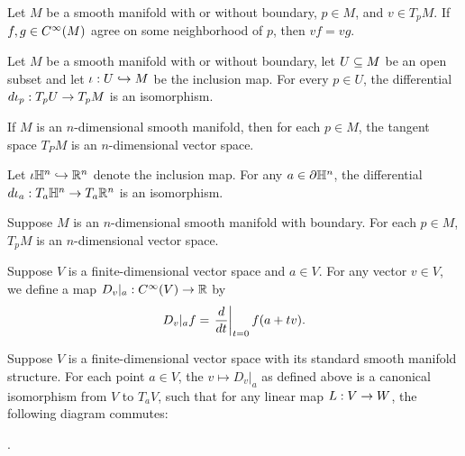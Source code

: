 \setcounter{thm}{7}

\begin{prop}
Let $M$ be a smooth manifold with or without boundary, $p\in M$, and $v\in T_pM$. If $f,g\in C^\infty(M)$ agree on some neighborhood of $p$, then $vf = vg$.
\end{prop}

\begin{prop}
Let $M$ be a smooth manifold with or without boundary, let $U\subseteq M$ be an open subset and let $\iota:U\hookrightarrow M$ be the inclusion map. For every $p\in U$, the differential $d\iota_p:T_pU\rightarrow T_pM$ is an isomorphism.
\end{prop}

\begin{prop}
If $M$ is an $n$-dimensional smooth manifold, then for each $p\in M$, the tangent space $T_PM$ is an $n$-dimensional vector space.
\end{prop}

\begin{lem}
Let $\iota\mathbb{H}^n\hookrightarrow \mathbb{R}^n$ denote the inclusion map. For any $a\in \partial \mathbb{H}^n$, the differential $d\iota_a:T_a\mathbb{H}^n\rightarrow T_a\mathbb{R}^n$ is an isomorphism.
\end{lem}

\begin{prop}
Suppose $M$ is an $n$-dimensional smooth manifold with boundary. For each $p\in M$, $T_pM$ is an $n$-dimensional vector space.
\end{prop}

\dfn Suppose $V$ is a finite-dimensional vector space and $a\in V$. For any vector $v\in V$, we define a map $D_v|_a:C^\infty(V) \rightarrow \mathbb{R}$ by 
\[D_v|_a f = \left. \frac{d}{dt}\right|_{t=0}f(a + tv).\]

\begin{prop}
Suppose $V$ is a finite-dimensional vector space with its standard smooth manifold structure. For each point $a\in V$, the $v\mapsto D_v|_a$ as defined above is a canonical isomorphism from $V$ to $T_aV$, such that for any linear map $L:V\rightarrow W$, the following diagram commutes:
\begin{center}
.
\end{center}
\end{prop}

